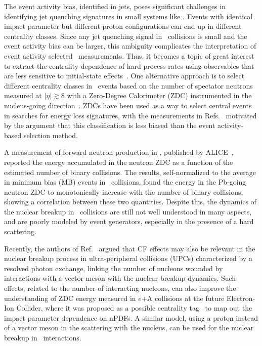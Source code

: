 \documentclass[PAPER, atlasdraft=false, USenglish, cernpreprint]{atlasdoc}
\begin{document}
The event activity bias, identified in jets, poses significant challenges in identifying jet quenching signatures in small systems like \pxA. Events with identical impact parameter but different proton configurations can end up in different centrality classes.  Since any jet quenching signal in \pxPb\ collisions is small and the event activity bias can be larger, this ambiguity complicates the interpretation of event activity selected \pxPb\ measurements.
Thus, it becomes a topic of great interest to extract the centrality dependence of hard process rates using observables that are less sensitive to initial-state effects~\cite{Perepelitsa:2024eik}. 
One alternative approach is to select different centrality classes in \pxA\ events based on the number of spectator neutrons measured at $|\eta|\gtrsim 8$ with a Zero-Degree Calorimeter (ZDC) instrumented in the nucleus-going direction~\cite{PERF-2007-01,Cortese_2019}.
ZDCs have been used as a way to select central events in searches for energy loss signatures, with the measurements in Refs.~\cite{ALICE:2017svf, ATLAS:2022iyq} motivated by the argument that this classification is less biased than the event activity-based selection method.



A measurement of forward neutron production in \pxPb, published by ALICE~\cite{ALICE:2021poe}, reported the energy accumulated in the neutron ZDC as a function of the estimated number of binary collisions. 
The results, self-normalized to the average in minimum bias (MB) events in \pxPb\ collisions, found the energy in the Pb-going neutron ZDC to monotonically increase with the number of binary collisions, showing a correlation between these two quantities.
Despite this, the dynamics of the nuclear breakup in \pxPb\ collisions are still not well understood in many aspects, and are poorly modeled by event generators, 
especially in the presence of a hard scattering.


Recently, the authors of Ref.~\cite{Alvioli:2024cmd} argued that CF effects may also be relevant in the nuclear breakup process in ultra-peripheral collisions (UPCs) characterized by a resolved photon exchange, linking the number of nucleons wounded by interactions with a vector meson with the nuclear breakup dynamics. 
Such effects, related to the number of interacting nucleons, can also improve the understanding of ZDC energy measured in $e$+A collisions at the future Electron-Ion Collider, where it was proposed as a possible centrality tag~\cite{Zheng:2014cha} to map out the impact parameter dependence on nPDFs.
A similar model, using a proton instead of a vector meson in the scattering with the nucleus, can be used for the nuclear breakup in \pxPb\ interactions. 
\end{document}
